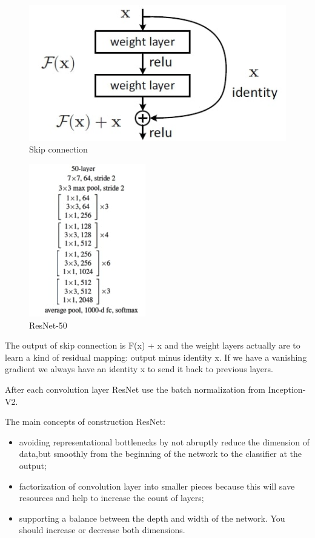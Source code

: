 \documentclass[titlepage]{report}
\begin{document}
\begin{figure}[h!]
    \centering
    \includegraphics[scale=0.4]{resnet_1}
    \caption{Skip connection}
\end{figure}

\begin{figure}
\centering
\includegraphics[scale=0.8]{resnet_2}
\caption{ResNet-50}
\label{fig:resnet_50}
\end{figure}

The output of skip connection is  F(x) + x and the weight layers actually are to learn a kind of residual mapping: output minus identity x. If we have a vanishing gradient we always have an identity x to send it back to previous layers. 

After each convolution layer ResNet use the batch normalization from Inception-V2. 

The main concepts of construction ResNet:
\begin{itemize}
  \item avoiding representational bottlenecks by not abruptly reduce the dimension of data,but smoothly from the beginning of the network to the classifier at the output;
  \item factorization of convolution layer into smaller pieces because this will save resources and help to increase the count of layers;
  \item supporting a balance between the depth and width of the network. You should increase or decrease both dimensions.
\end{itemize}
\end{document}
